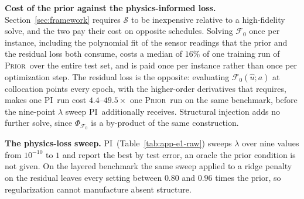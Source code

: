 \documentclass{article}
\newcommand{\armpi}{\textsc{PI}}
\newcommand{\armprior}{\textsc{Prior}}
\begin{document}
\textbf{Cost of the prior against the physics-informed loss.}
Section~\ref{sec:framework} requires $\mathcal{S}$ to be inexpensive relative to a
high-fidelity solve, and the two pay their cost on opposite schedules. Solving
$\mathcal{F}_0$ once per instance, including the polynomial fit of the sensor readings
that the prior and the residual loss both consume, costs a median of $16\%$ of one training run of \armprior\ over the entire test set, and is
paid once per instance rather than once per optimization step. The residual loss is
the opposite: evaluating $\mathcal{F}_0(\hat u;a)$ at collocation points every epoch,
with the higher-order derivatives that requires, makes one \armpi\ run cost
$4.4$--$49.5\times$ one \armprior\ run on the same benchmark, before the nine-point
$\lambda$ sweep \armpi\ additionally receives. Structural injection adds no further
solve, since $\Phi_{\mathcal{F}_0}$ is a by-product of the same construction.

\textbf{The physics-loss sweep.}
\armpi\ (Table~\ref{tab:app-e1-raw})
sweeps $\lambda$ over nine values from $10^{-10}$
to $1$ and report the best by test error, an oracle the prior condition is not given. On the layered
benchmark the same sweep applied to a ridge penalty on the residual leaves every setting between
$0.80$ and $0.96$ times the prior, so regularization cannot manufacture absent structure.
\end{document}
